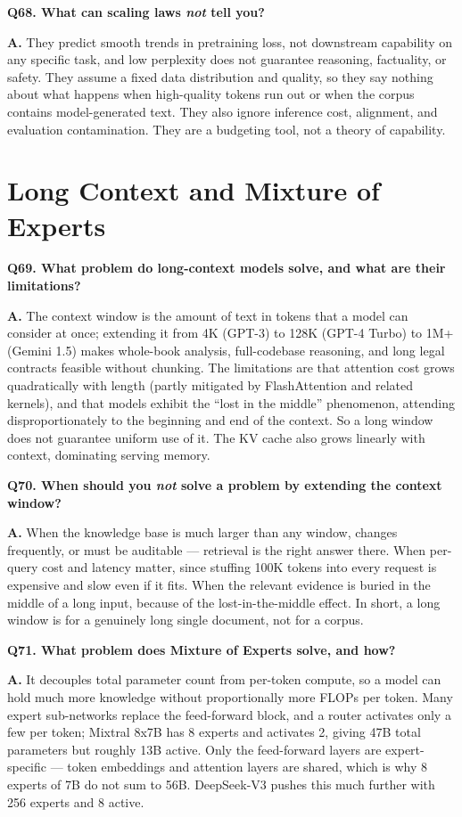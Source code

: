 \documentclass[11pt]{article}
\begin{document}
\medskip
\noindent\textbf{Q68. What can scaling laws \emph{not} tell you?}

\noindent\textbf{A.} They predict smooth trends in pretraining loss, not downstream capability on any specific task, and low perplexity does not guarantee reasoning, factuality, or safety. They assume a fixed data distribution and quality, so they say nothing about what happens when high-quality tokens run out or when the corpus contains model-generated text. They also ignore inference cost, alignment, and evaluation contamination. They are a budgeting tool, not a theory of capability.

\section{Long Context and Mixture of Experts}

\noindent\textbf{Q69. What problem do long-context models solve, and what are their limitations?}

\noindent\textbf{A.} The context window is the amount of text in tokens that a model can consider at once; extending it from 4K (GPT-3) to 128K (GPT-4 Turbo) to 1M+ (Gemini 1.5) makes whole-book analysis, full-codebase reasoning, and long legal contracts feasible without chunking. The limitations are that attention cost grows quadratically with length (partly mitigated by FlashAttention and related kernels), and that models exhibit the ``lost in the middle'' phenomenon, attending disproportionately to the beginning and end of the context. So a long window does not guarantee uniform use of it. The KV cache also grows linearly with context, dominating serving memory.

\medskip
\noindent\textbf{Q70. When should you \emph{not} solve a problem by extending the context window?}

\noindent\textbf{A.} When the knowledge base is much larger than any window, changes frequently, or must be auditable --- retrieval is the right answer there. When per-query cost and latency matter, since stuffing 100K tokens into every request is expensive and slow even if it fits. When the relevant evidence is buried in the middle of a long input, because of the lost-in-the-middle effect. In short, a long window is for a genuinely long single document, not for a corpus.

\medskip
\noindent\textbf{Q71. What problem does Mixture of Experts solve, and how?}

\noindent\textbf{A.} It decouples total parameter count from per-token compute, so a model can hold much more knowledge without proportionally more FLOPs per token. Many expert sub-networks replace the feed-forward block, and a router activates only a few per token; Mixtral 8x7B has 8 experts and activates 2, giving 47B total parameters but roughly 13B active. Only the feed-forward layers are expert-specific --- token embeddings and attention layers are shared, which is why 8 experts of 7B do not sum to 56B. DeepSeek-V3 pushes this much further with 256 experts and 8 active.
\end{document}
